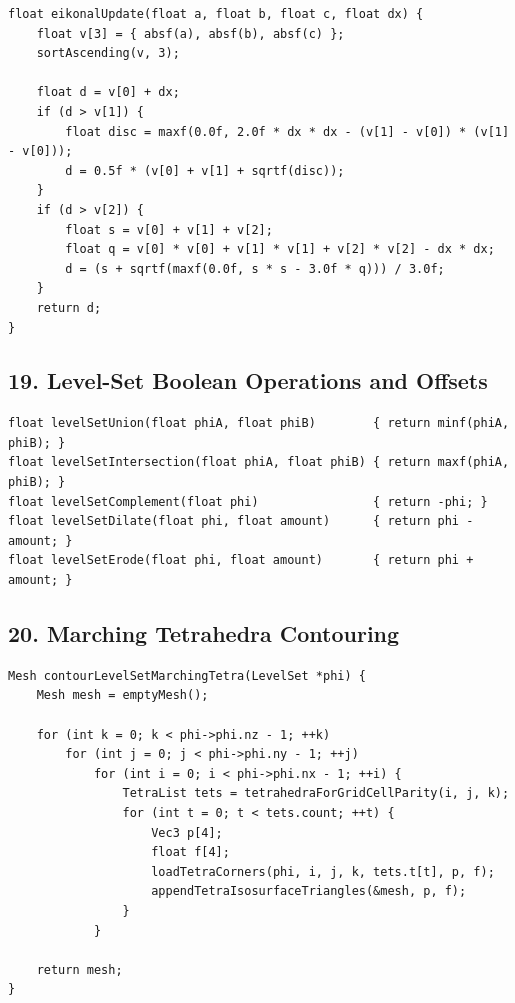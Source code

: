 \documentclass[10pt,letterpaper]{article}
\begin{document}
\begin{verbatim}
float eikonalUpdate(float a, float b, float c, float dx) {
    float v[3] = { absf(a), absf(b), absf(c) };
    sortAscending(v, 3);

    float d = v[0] + dx;
    if (d > v[1]) {
        float disc = maxf(0.0f, 2.0f * dx * dx - (v[1] - v[0]) * (v[1] - v[0]));
        d = 0.5f * (v[0] + v[1] + sqrtf(disc));
    }
    if (d > v[2]) {
        float s = v[0] + v[1] + v[2];
        float q = v[0] * v[0] + v[1] * v[1] + v[2] * v[2] - dx * dx;
        d = (s + sqrtf(maxf(0.0f, s * s - 3.0f * q))) / 3.0f;
    }
    return d;
}
\end{verbatim}

\subsection*{19. Level-Set Boolean Operations and Offsets}

\begin{verbatim}
float levelSetUnion(float phiA, float phiB)        { return minf(phiA, phiB); }
float levelSetIntersection(float phiA, float phiB) { return maxf(phiA, phiB); }
float levelSetComplement(float phi)                { return -phi; }
float levelSetDilate(float phi, float amount)      { return phi - amount; }
float levelSetErode(float phi, float amount)       { return phi + amount; }
\end{verbatim}

\subsection*{20. Marching Tetrahedra Contouring}

\begin{verbatim}
Mesh contourLevelSetMarchingTetra(LevelSet *phi) {
    Mesh mesh = emptyMesh();

    for (int k = 0; k < phi->phi.nz - 1; ++k)
        for (int j = 0; j < phi->phi.ny - 1; ++j)
            for (int i = 0; i < phi->phi.nx - 1; ++i) {
                TetraList tets = tetrahedraForGridCellParity(i, j, k);
                for (int t = 0; t < tets.count; ++t) {
                    Vec3 p[4];
                    float f[4];
                    loadTetraCorners(phi, i, j, k, tets.t[t], p, f);
                    appendTetraIsosurfaceTriangles(&mesh, p, f);
                }
            }

    return mesh;
}
\end{verbatim}
\end{document}
